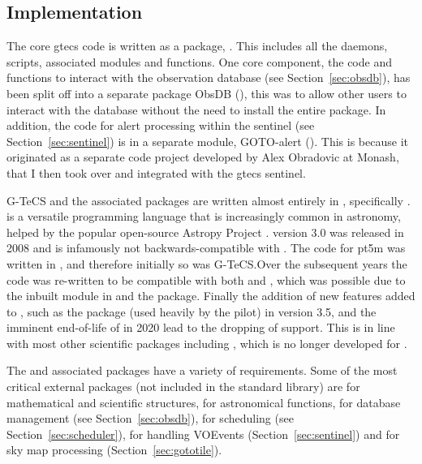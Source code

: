 \begin{colsection}
\begin{colsection}
\end{colsection}


\subsection{Implementation}
\label{sec:implementation}
\begin{colsection}

The core \gls{gtecs} code is written as a  package, . This includes all the daemons, scripts, associated modules and functions. One core component, the code and functions to interact with the observation database (see Section~\ref{sec:obsdb}), has been split off into a separate  package ObsDB (), this was to allow other users to interact with the database without the need to install the entire  package. In addition, the code for alert processing within the sentinel (see Section~\ref{sec:sentinel}) is in a separate module, GOTO-alert (). This is because it originated as a separate code project developed by Alex Obradovic at Monash, that I then took over and integrated with the \gls{gtecs} sentinel.

G-TeCS and the associated packages are written almost entirely in , specifically .  is a versatile programming language that is increasingly common in astronomy, helped by the popular open-source Astropy Project \citep{astropy}.  version 3.0 was released in 2008 and is infamously not backwards-compatible with . The code for \gls{pt5m} was written in , and therefore initially so was G-TeCS.\@ Over the subsequent years the code was re-written to be compatible with both  and , which was possible due to the inbuilt  module in  and the  package. Finally the addition of new features added to , such as the  package (used heavily by the pilot) in version 3.5, and the imminent end-of-life of  in 2020 lead to the dropping of  support. This is in line with most other scientific  packages including , which is no longer developed for . %

The  and associated packages have a variety of requirements. Some of the most critical external packages (not included in the  standard library) are  for mathematical and scientific structures,  for astronomical functions,  for  database management (see Section~\ref{sec:obsdb}),  for scheduling (see Section~\ref{sec:scheduler}),  for handling VOEvents (Section~\ref{sec:sentinel}) and  for sky map processing (Section~\ref{sec:gototile}).


\end{colsection}
\end{colsection}
